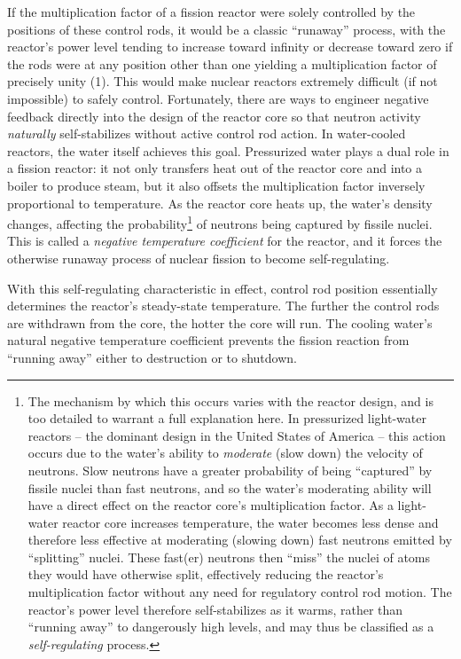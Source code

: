 If the multiplication factor of a fission reactor were solely controlled by the positions of these control rods, it would be a classic ``runaway'' process, with the reactor's power level tending to increase toward infinity or decrease toward zero if the rods were at any position other than one yielding a multiplication factor of precisely unity (1).  This would make nuclear reactors extremely difficult (if not impossible) to safely control.  Fortunately, there are ways to engineer negative feedback directly into the design of the reactor core so that neutron activity \textit{naturally} self-stabilizes without active control rod action.  In water-cooled reactors, the water itself achieves this goal.  Pressurized water plays a dual role in a fission reactor: it not only transfers heat out of the reactor core and into a boiler to produce steam, but it also offsets the multiplication factor inversely proportional to temperature.  As the reactor core heats up, the water's density changes, affecting the probability\footnote{The mechanism by which this occurs varies with the reactor design, and is too detailed to warrant a full explanation here.  In pressurized light-water reactors -- the dominant design in the United States of America -- this action occurs due to the water's ability to \textit{moderate} (slow down) the velocity of neutrons.  Slow neutrons have a greater probability of being ``captured'' by fissile nuclei than fast neutrons, and so the water's moderating ability will have a direct effect on the reactor core's multiplication factor.  As a light-water reactor core increases temperature, the water becomes less dense and therefore less effective at moderating (slowing down) fast neutrons emitted by ``splitting'' nuclei.  These fast(er) neutrons then ``miss'' the nuclei of atoms they would have otherwise split, effectively reducing the reactor's multiplication factor without any need for regulatory control rod motion.  The reactor's power level therefore self-stabilizes as it warms, rather than ``running away'' to dangerously high levels, and may thus be classified as a \textit{self-regulating} process.} of neutrons being captured by fissile nuclei.  This is called a \textit{negative temperature coefficient} for the reactor, and it forces the otherwise runaway process of nuclear fission to become self-regulating.

With this self-regulating characteristic in effect, control rod position essentially determines the reactor's steady-state temperature.  The further the control rods are withdrawn from the core, the hotter the core will run.  The cooling water's natural negative temperature coefficient prevents the fission reaction from ``running away'' either to destruction or to shutdown.

